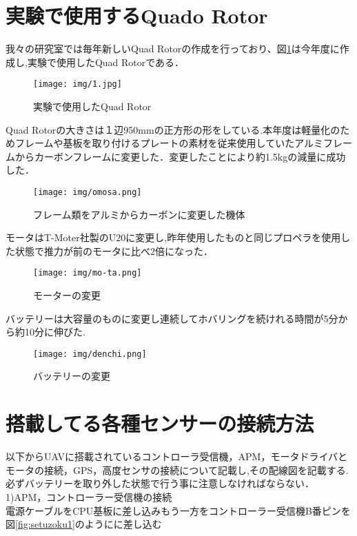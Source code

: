 \documentclass[12pt,oneside]{sotsuken_paper}
\begin{document}
\section{実験で使用するQuado Rotor}我々の研究室では毎年新しいQuad Rotorの作成を行っており、図\ref{fig:1}は今年度に作成し,実験で使用したQuad Rotorである．

\begin{figure}[H]
\begin{center}
\texttt{[image: img/1.jpg]}
\end{center}
\caption{実験で使用したQuad Rotor}
\label{fig:1}
\end{figure}

Quad Rotorの大きさは１辺950mmの正方形の形をしている.本年度は軽量化のためフレームや基板を取り付けるプレートの素材を従来使用していたアルミフレームからカーボンフレームに変更した．変更したことにより約1.5kgの減量に成功した．

\begin{figure}[H]
\begin{center}
\texttt{[image: img/omosa.png]}
\end{center}
\caption{フレーム類をアルミからカーボンに変更した機体}
\label{fig:omosa.jpg}
\end{figure}

モータはT-Moter社製のU20に変更し,昨年使用したものと同じプロペラを使用した状態で推力が前のモータに比べ2倍になった．

\begin{figure}[H]
\begin{center}
\texttt{[image: img/mo-ta.png]}
\end{center}
\caption{モーターの変更}
\label{fig:mo-ta}
\end{figure}

バッテリーは大容量のものに変更し連続してホバリングを続けれる時間が5分から約10分に伸びた.
\begin{figure}[H]
\begin{center}
\texttt{[image: img/denchi.png]}
\end{center}
\caption{バッテリーの変更}
\label{fig:denchi}
\end{figure}

\section{搭載してる各種センサーの接続方法}
以下からUAVに搭載されているコントローラ受信機，APM，モータドライバとモータの接続，GPS，高度センサの接続について記載し,その配線図を記載する.
必ずバッテリーを取り外した状態で行う事に注意しなければならない．\\ 
1)APM，コントローラー受信機の接続\\
電源ケーブルをCPU基板に差し込みもう一方をコントローラー受信機B番ピンを図\ref{fig:setuzoku1}のようにに差し込む\\
\end{document}
